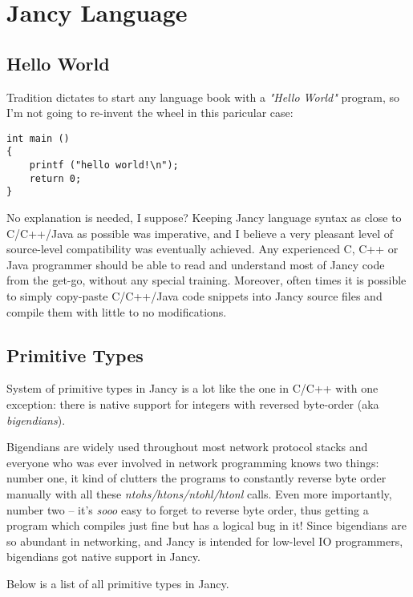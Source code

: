 \documentclass[oneside]{book}
\begin{document}
\chapter{Jancy Language}

\section{Hello World}

Tradition dictates to start any language book with a \emph{"Hello World"} program, so I'm not going to re-invent the wheel in this paricular case:

\begin{lstlisting}
int main ()
{
    printf ("hello world!\n");
    return 0;
}
\end{lstlisting}

No explanation is needed, I suppose? Keeping Jancy language syntax as close to C/C++/Java as possible was imperative, and I believe a very pleasant level of source-level compatibility was eventually achieved. Any experienced C, C++ or Java programmer should be able to read and understand most of Jancy code from the get-go, without any special training. Moreover, often times it is possible to simply copy-paste C/C++/Java code snippets into Jancy source files and compile them with little to no modifications.

\section{Primitive Types}

System of primitive types in Jancy is a lot like the one in C/C++ with one exception: there is native support for integers with reversed byte-order (aka \emph{bigendians}). 

Bigendians are widely used throughout most network protocol stacks and everyone who was ever involved in network programming knows two things: number one, it kind of clutters the programs to constantly reverse byte order manually with all these \emph{ntohs/htons/ntohl/htonl} calls. Even more importantly, number two -- it's \emph{sooo} easy to forget to reverse byte order, thus getting a program which compiles just fine but has a logical bug in it! Since bigendians are so abundant in networking, and Jancy is intended for low-level IO programmers, bigendians got native support in Jancy. 

Below is a list of all primitive types in Jancy.
\end{document}
